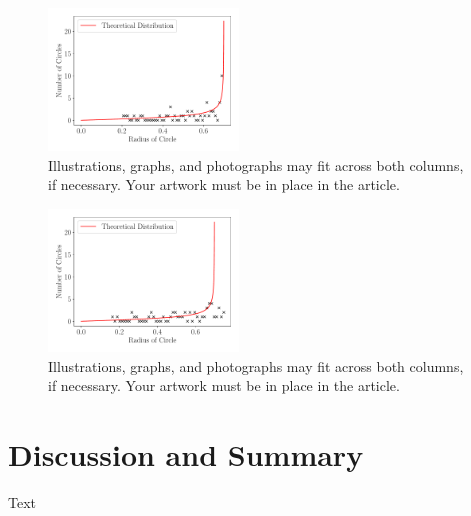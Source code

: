 \documentclass[journal]{IEEEtran}
\begin{document}
\begin{figure}[H]%
\begin{center}
\includegraphics[width=0.45\textwidth]{./../Figures/750_07_Noise_100.pdf}
\caption{Illustrations, graphs, and photographs may fit across both columns, if
  necessary. Your artwork must be in place in the article.}
\label{fig:2noise}
\end{center}
\end{figure}

\begin{figure}[H]%
\begin{center}
\includegraphics[width=0.45\textwidth]{./../Figures/750_07_Noise_10.pdf}
\caption{Illustrations, graphs, and photographs may fit across both columns, if
  necessary. Your artwork must be in place in the article.}
\label{fig:1noise}
\end{center}
\end{figure}

\section{Discussion and Summary}
Text



\end{document}
